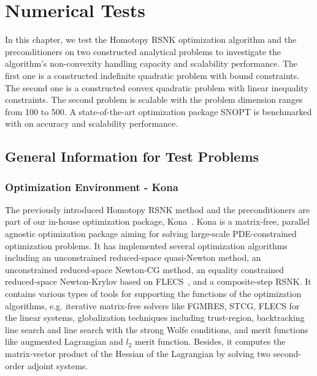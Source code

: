  
\chapter{Numerical Tests}

In this chapter, we test the Homotopy RSNK optimization algorithm and the preconditioners 
on two constructed analytical problems to investigate the algorithm's non-convexity 
handling capacity and scalability performance. The first one is a constructed indefinite 
quadratic problem with bound constraints. The second one is a constructed convex 
quadratic problem with linear inequality constraints. The second problem is scalable with 
the problem dimension ranges from 100 to 500. A state-of-the-art optimization package 
SNOPT is benchmarked with on accuracy and scalability performance.   

\section{General Information for Test Problems}
\subsection{Optimization Environment - Kona}\label{sec:kona_mv}
The previously introduced Homotopy RSNK method and the preconditioners are part of 
our in-house optimization package, Kona~\cite{dener:scitech2016}. Kona is a matrix-free, 
parallel agnostic optimization package aiming for solving large-scale PDE-constrained 
optimization problems.  It has implemented several optimization 
algorithms including an unconstrained 
reduced-space quasi-Newton method, an unconstrained reduced-space 
Newton-CG method, an equality constrained reduced-space Newton-Krylov 
based on FLECS~\cite{hicken:flecs2014}, and a composite-step RSNK.    
It contains various types of tools for supporting the functions of the optimization algorithms, e.g. 
iterative matrix-free solvers like FGMRES, STCG, FLECS for the linear systems, 
globalization techniques including trust-region, backtracking line search and line search with 
the strong Wolfe conditions, and merit functions like augmented Lagrangian and $l_2$ 
merit function. Besides, it computes the matrix-vector product of the Hessian of the Lagrangian 
by solving two second-order adjoint systems. 


